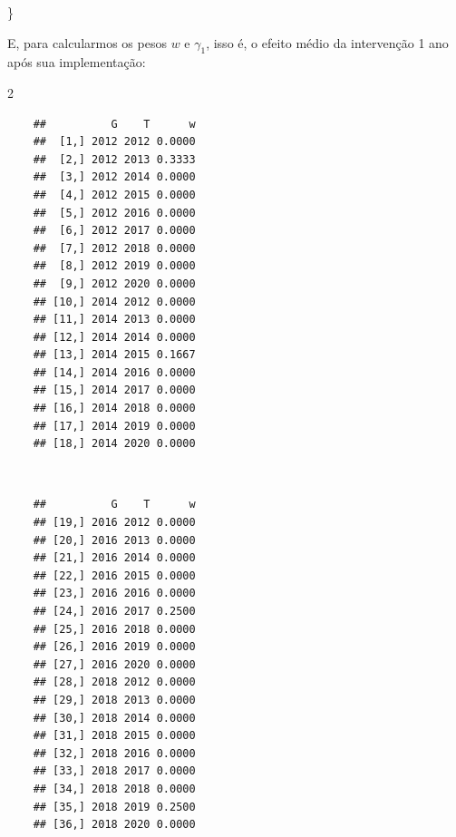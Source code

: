 \documentclass[portugues]{article}
\newenvironment{Shaded}{\begin{snugshade}}{\end{snugshade}}
\newcommand{\AttributeTok}[1]{\textcolor[rgb]{0.13,0.29,0.53}{#1}}
\newcommand{\CommentTok}[1]{\textcolor[rgb]{0.56,0.35,0.01}{\textit{#1}}}
\newcommand{\DecValTok}[1]{\textcolor[rgb]{0.00,0.00,0.81}{#1}}
\newcommand{\FunctionTok}[1]{\textcolor[rgb]{0.13,0.29,0.53}{\textbf{#1}}}
\newcommand{\NormalTok}[1]{#1}
\newcommand{\OtherTok}[1]{\textcolor[rgb]{0.56,0.35,0.01}{#1}}
\newcommand{\SpecialCharTok}[1]{\textcolor[rgb]{0.81,0.36,0.00}{\textbf{#1}}}
\begin{document}
\begin{box_code}
\begin{Shaded}
\begin{Highlighting}[]
\NormalTok{\}}

\end{Highlighting}
\end{Shaded}

E, para calcularmos os pesos $w$ e $\gamma_{1}$, isso é, o efeito médio da intervenção 1 ano após sua implementação:

\begin{Shaded}
\end{Shaded}

\begin{multicols}{2}
    \centering
    \begin{verbatim}
    ##          G    T      w
    ##  [1,] 2012 2012 0.0000
    ##  [2,] 2012 2013 0.3333
    ##  [3,] 2012 2014 0.0000
    ##  [4,] 2012 2015 0.0000
    ##  [5,] 2012 2016 0.0000
    ##  [6,] 2012 2017 0.0000
    ##  [7,] 2012 2018 0.0000
    ##  [8,] 2012 2019 0.0000
    ##  [9,] 2012 2020 0.0000
    ## [10,] 2014 2012 0.0000
    ## [11,] 2014 2013 0.0000
    ## [12,] 2014 2014 0.0000
    ## [13,] 2014 2015 0.1667
    ## [14,] 2014 2016 0.0000
    ## [15,] 2014 2017 0.0000
    ## [16,] 2014 2018 0.0000
    ## [17,] 2014 2019 0.0000
    ## [18,] 2014 2020 0.0000
    \end{verbatim}
    \\
    \begin{verbatim}
    ##          G    T      w
    ## [19,] 2016 2012 0.0000
    ## [20,] 2016 2013 0.0000
    ## [21,] 2016 2014 0.0000
    ## [22,] 2016 2015 0.0000
    ## [23,] 2016 2016 0.0000
    ## [24,] 2016 2017 0.2500
    ## [25,] 2016 2018 0.0000
    ## [26,] 2016 2019 0.0000
    ## [27,] 2016 2020 0.0000
    ## [28,] 2018 2012 0.0000
    ## [29,] 2018 2013 0.0000
    ## [30,] 2018 2014 0.0000
    ## [31,] 2018 2015 0.0000
    ## [32,] 2018 2016 0.0000
    ## [33,] 2018 2017 0.0000
    ## [34,] 2018 2018 0.0000
    ## [35,] 2018 2019 0.2500
    ## [36,] 2018 2020 0.0000
    \end{verbatim}
\end{multicols}


\end{box_code}
\end{document}
